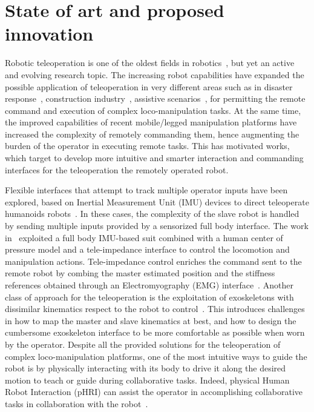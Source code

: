 \newpage
\section{State of art and proposed innovation} 

Robotic teleoperation is one of the oldest fields in robotics~\cite{Goertz1952},⁠ but yet an active and evolving research topic. 
The increasing robot capabilities have expanded the possible application of teleoperation in very different areas such as in disaster response~\cite{Liu2013}⁠⁠, construction industry~\cite{Carra2018}, assistive scenarios~\cite{Petrich2022}, for permitting the remote command and execution of complex loco-manipulation tasks.
At the same time, the improved capabilities of recent mobile/legged manipulation platforms have increased the complexity of remotely commanding them, hence augmenting the burden of the operator in executing remote tasks. This has motivated works, which target to develop more intuitive and smarter interaction and commanding interfaces for the teleoperation the remotely operated robot.

Flexible interfaces that attempt to track multiple operator inputs have been explored, based on Inertial Measurement Unit (IMU) devices to direct teleoperate humanoids robots~\cite{Darvish23}. In these cases, the complexity of the slave robot is handled by sending multiple inputs provided by a sensorized full body interface. The work in~\cite{Wu2019}⁠ exploited a full body IMU-based suit combined with a human center of pressure model and a tele-impedance interface to control the locomotion and manipulation actions. Tele-impedance control enriches the command sent to the remote robot by combing the master estimated position and the stiffness references obtained through an Electromyography (EMG) interface~\cite{Ajoudani2012}⁠. Another class of approach for the teleoperation is the exploitation of exoskeletons with dissimilar kinematics respect to the robot to control~\cite{Rebelo2012}⁠. This introduces challenges in how to map the master and slave kinematics at best, and how to design the cumbersome exoskeleton interface to be more comfortable as possible when worn by the operator. Despite all the provided solutions for the teleoperation of complex loco-manipulation platforms, one of the most intuitive ways to guide the robot is by physically interacting with its body to drive it along the desired motion to teach or guide during collaborative tasks. Indeed, physical Human Robot Interaction (pHRI) can assist the operator in accomplishing collaborative tasks in collaboration with the robot~\cite{Cherubini2016, Kruger2009}⁠. 


